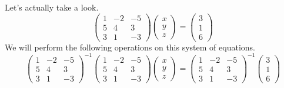 \documentclass{ltjsbook}
\begin{document}
Let's actually take a look.
\[
	\begin{pmatrix} 1 & -2 & -5 \\
                5 & 4  & 3  \\
                3 & 1  & -3\end{pmatrix}
	\begin{pmatrix} x \\ y \\ z \end{pmatrix}
	=
	\begin{pmatrix} 3 \\ 1 \\ 6 \end{pmatrix}
\]
We will perform the following operations on this system of equations.
\[
	\begin{pmatrix} 1 & -2 & -5 \\
                5 & 4  & 3  \\
                3 & 1  & -3\end{pmatrix}^{-1}
	\begin{pmatrix} 1 & -2 & -5 \\
                5 & 4  & 3  \\
                3 & 1  & -3\end{pmatrix}
	\begin{pmatrix} x \\ y \\ z \end{pmatrix}
	=
	\begin{pmatrix} 1 & -2 & -5 \\
                5 & 4  & 3  \\
                3 & 1  & -3\end{pmatrix}^{-1}
	\begin{pmatrix} 3 \\ 1 \\ 6 \end{pmatrix}
\]
\end{document}
